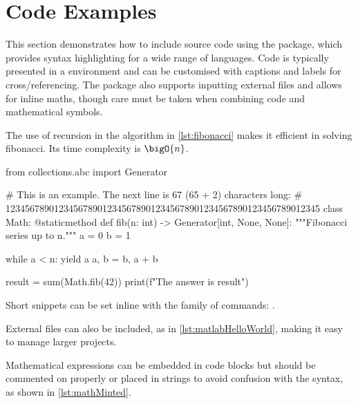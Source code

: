 \section{Code Examples}

This section demonstrates how to include source code using the  package, which provides syntax highlighting for a wide range of languages. Code is typically presented in a  environment and can be customised with captions and labels for cross\-/referencing. The  package also supports inputting external files and allows for inline maths, though care must be taken when combining code and mathematical symbols.

The use of \gls{recursion} in the algorithm in \cref{lst:fibonacci} makes it efficient in solving \gls{fibonacci}. Its time \gls{complexity} is $\bigO{n}$.

\begin{listing}[H]
  \begin{pythoncode}
from collections.abc import Generator

# This is an example. The next line is 67 (65 + 2) characters long:
# 12345678901234567890123456789012345678901234567890123456789012345
class Math:
    @staticmethod
    def fib(n: int) -> Generator[int, None, None]:
        """Fibonacci series up to n."""
        a = 0
        b = 1

        while a < n:
            yield a
            a, b = b, a + b

result = sum(Math.fib(42))
print(f"The answer is {result}")
  \end{pythoncode}
  \caption{Python implementation of the Fibonacci sequence.}
  \label{lst:fibonacci}
\end{listing}

Short snippets can be set inline with the \latexinline{\pythoninline} family of commands: .

External files can also be included, as in \cref{lst:matlabHelloWorld}, making it easy to manage larger projects.

\begin{listing}[H]
  \caption{A simple MATLAB programme.}
  \label{lst:matlabHelloWorld}
\end{listing}

Mathematical expressions can be embedded in code blocks but should be commented on properly or placed in strings to avoid confusion with the syntax, as shown in \cref{lst:mathMinted}.

